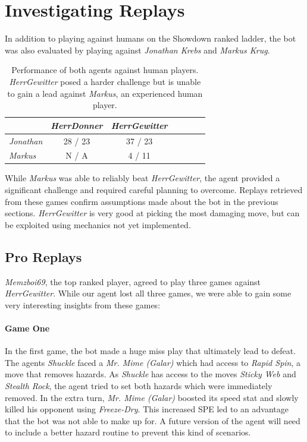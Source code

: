 \section{Investigating Replays}
\label{sec:investigate-replays}
In addition to playing against humans on the Showdown ranked ladder, the bot was also evaluated by playing
against \textit{Jonathan Krebs} and \textit{Markus Krug}. 
\begin{table}[h]
  \centering
  \begin{tabular}{|l|c|c|c|c|c|c|}
    \hline
    & \emph{HerrDonner} & \emph{HerrGewitter} \\
    \hline
    \emph{Jonathan} & 28 / 23 & 37 / 23 \\
    \hline
    \emph{Markus} & N / A & 4 / 11 \\
    \hline
    \end{tabular}
    \caption{Performance of both agents against human players. \textit{HerrGewitter} posed a 
    harder challenge but is unable to gain a lead against \textit{Markus}, an experienced
    human player.}
    \label{tab:agents-vs-humans}
\end{table}
While \textit{Markus} was able to reliably beat \textit{HerrGewitter}, the agent provided
a significant challenge and required careful planning to overcome. Replays retrieved
from these games confirm assumptions made about the bot in the previous sections. \textit{HerrGewitter}
is very good at picking the most damaging move, but can be exploited using mechanics not yet 
implemented. 

\subsection{Pro Replays}
\textit{Memzboi69}, the top ranked player, agreed to play three games against \textit{HerrGewitter}. 
While our agent lost all three 
games, we were able to gain some very interesting insights from these games:

\paragraph{Game One}
In the first game, the bot made a huge miss play that ultimately lead to defeat. The agents \textit{Shuckle} faced a 
\textit{Mr. Mime (Galar)} which had access to \textit{Rapid Spin}, a move that removes hazards. As \textit{Shuckle}
has access to the moves \textit{Sticky Web} and \textit{Stealth Rock}, the agent tried to set both hazards
which were immediately removed. In the extra turn, \textit{Mr. Mime (Galar)} boosted its speed stat and slowly
killed his opponent using \textit{Freeze-Dry}. This increased \ac{SPE} led to an advantage that the bot was
not able to make up for. A future version of the agent will need to include a better hazard routine to prevent
this kind of scenarios.  


